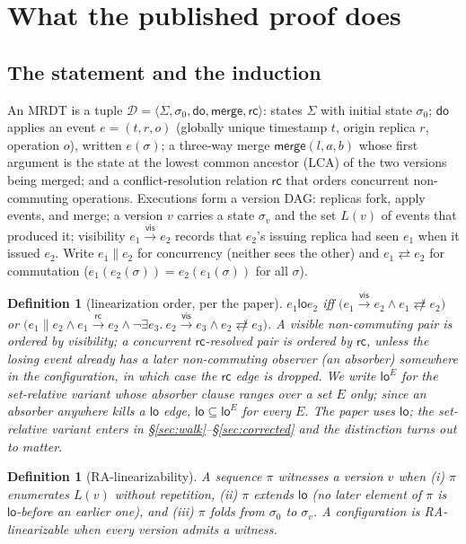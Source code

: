 \documentclass[11pt]{article}
\newtheorem{definition}[theorem]{Definition}
\newcommand{\vis}{\xrightarrow{\mathsf{vis}}}
\newcommand{\rc}{\xrightarrow{\mathsf{rc}}}
\newcommand{\rcrel}{\mathsf{rc}}
\newcommand{\comm}{\rightleftarrows}
\newcommand{\ncomm}{\not\rightleftarrows}
\newcommand{\mergeL}{\mathsf{merge}}
\newcommand{\Sinit}{\sigma_0}
\newcommand{\loE}[1]{\mathsf{lo}^{#1}}
\newcommand{\lopaper}{\mathsf{lo}}
\newcommand{\M}[1]{\mathcal{#1}}
\begin{document}
\section{What the published proof does}
\label{sec:published}

\subsection{The statement and the induction}

An MRDT is a tuple $\M{D} = \langle \Sigma, \Sinit, \mathsf{do},
\mergeL, \rcrel \rangle$: states $\Sigma$ with initial state $\Sinit$;
$\mathsf{do}$ applies an event $e = (t, r, o)$ (globally unique
timestamp $t$, origin replica $r$, operation $o$), written $e(\sigma)$;
a three-way merge $\mergeL(l, a, b)$ whose first argument is the state
at the lowest common ancestor (LCA) of the two versions being merged;
and a conflict-resolution relation $\rcrel$ that orders concurrent
non-commuting operations. Executions form a version DAG: replicas fork,
apply events, and merge; a version $v$ carries a state $\sigma_v$ and
the set $L(v)$ of events that produced it; visibility $e_1 \vis e_2$
records that $e_2$'s issuing replica had seen $e_1$ when it issued
$e_2$. Write $e_1 \parallel e_2$ for concurrency (neither sees the
other) and $e_1 \comm e_2$ for commutation
($e_1(e_2(\sigma)) = e_2(e_1(\sigma))$ for all $\sigma$).

\begin{definition}[linearization order, per the paper]
\label{def:lo}
$e_1 \mathrel{\lopaper} e_2$ iff
$\bigl(e_1 \vis e_2 \wedge e_1 \ncomm e_2\bigr)$ or
$\bigl(e_1 \parallel e_2 \wedge e_1 \rc e_2 \wedge
\neg\exists e_3.\ e_2 \vis e_3 \wedge e_2 \ncomm e_3\bigr)$.
A visible non-commuting pair is ordered by visibility; a concurrent
$\rcrel$-resolved pair is ordered by $\rcrel$, unless the losing event
already has a later non-commuting observer (an \emph{absorber})
somewhere in the configuration, in which case the $\rcrel$ edge is
dropped. We write $\loE{E}$ for the set-relative variant whose absorber
clause ranges over a set $E$ only; since an absorber anywhere kills a
$\lopaper$ edge, $\lopaper \subseteq \loE{E}$ for every $E$. The paper
uses $\lopaper$; the set-relative variant enters in
\S\ref{sec:walk}--\S\ref{sec:corrected} and the distinction turns out
to matter.
\end{definition}

\begin{definition}[RA-linearizability]
A sequence $\pi$ \emph{witnesses} a version $v$ when (i) $\pi$
enumerates $L(v)$ without repetition, (ii) $\pi$ extends $\lopaper$
(no later element of $\pi$ is $\lopaper$-before an earlier one), and
(iii) $\pi$ folds from $\Sinit$ to $\sigma_v$. A configuration is
RA-linearizable when every version admits a witness.
\end{definition}
\end{document}
